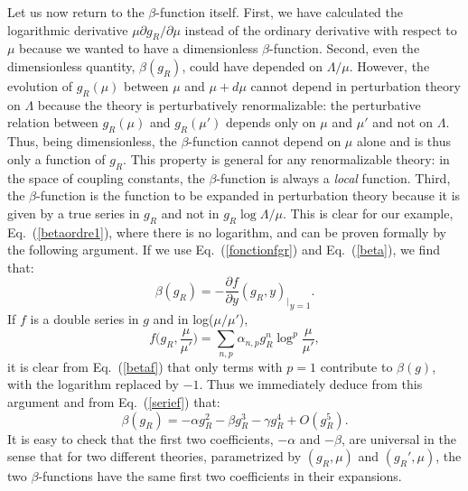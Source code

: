 \documentclass[floatfix,preprintnumbers,amsmath,amssymb,prb,12pt]{revtex4-1}
\begin{document}
{\begin{enumerate}[(i)]
\end{enumerate}

Let us now return to the $\beta$-function itself. First, we have
calculated the logarithmic derivative
$\mu\partial g_R/\partial\mu$ instead of the ordinary derivative
with respect to $\mu$ because we wanted
to have a dimensionless $\beta$-function. Second, even the
dimensionless quantity,
$\beta(g_R)$, could have depended on $\Lambda/\mu$.
However, the evolution of $g_R(\mu)$ between $\mu$ and
$\mu+d\mu$ cannot depend in perturbation theory on
$\Lambda$ because the theory is perturbatively renormalizable: the
perturbative relation between $g_R(\mu)$ and $g_R(\mu')$ depends
only on $\mu$ and
$\mu'$ and not on $\Lambda$. Thus, being dimensionless, the 
$\beta$-function cannot depend on $\mu$ alone and is thus only a
function of $g_R$. This property is general for any renormalizable
theory: in the space of coupling constants, the $\beta$-function
is always a {\em local} function. Third, the $\beta$-function is
the function to be expanded in perturbation theory because it is
given by a true series in $g_R$ and not in $g_R \log\Lambda/\mu$.
This is clear for our example, Eq.~(\ref{betaordre1}), where there
is no logarithm, and can be proven formally by the following
argument. If we use Eq.~(\ref{fonctionfgr}) and Eq.~(\ref{beta}),
we find that:
\begin{equation}
\beta(g_R) =-{\frac{\partial f}{\partial y}(g_R,y)_\big|}_{y=1}.
\label{betaf}
\end{equation}
If $f$ is a double series in $g$ and in log($\mu/\mu'$),
\begin{equation}
f\big(g_R,\frac{\mu}{\mu'}\big)=\sum_{n,p}\alpha_{n,p} g_R^n 
\log^p\frac{\mu}{\mu'},
\label{doubleserie}
\end{equation}
it is clear from Eq.~(\ref{betaf}) that only terms with $p=1$
contribute to $\beta(g)$, with the logarithm replaced by $-1$.
Thus we immediately deduce from this argument and from
Eq.~(\ref{serief}) that:
\begin{equation}
\beta(g_R)=-\alpha g_R^2 -\beta g_R^3 -\gamma g_R^4 +O(g_R^5).
\label{beta_ordre_g4}
\end{equation}
It is easy to check that the first two coefficients, $-\alpha$ and
$-\beta$, are universal in the sense that for two different
theories, parametrized by $(g_R,\mu)$ and $(g_R',\mu)$, the two
$\beta$-functions have the same first two coefficients in their
expansions.

}
\end{document}
